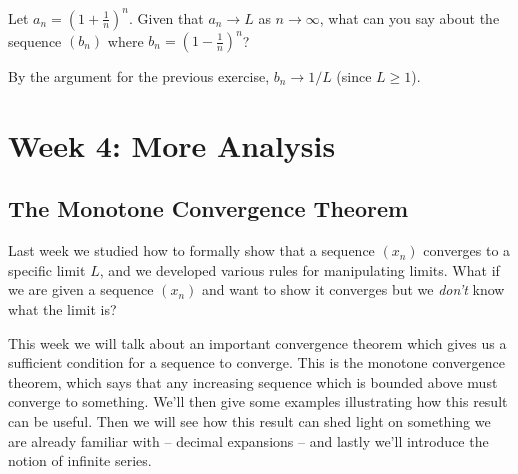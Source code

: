 \documentclass[11pt,dvipsnames]{book}
\numberwithin{figure}{section} %
\numberwithin{table}{section} %
\begin{document}
\begin{exercise}
Let $a_n = \left( 1+ \frac{1}{n}\right)^n$. Given that $a_n \to L$ as $n \to \infty$, what can you say about
the sequence $(b_n)$ where
$b_n = \left( 1- \frac{1}{n}\right)^n$?
\begin{solution}
By the argument for the previous exercise, $b_n \to 1/L$ (since $L \geq 1$).
\end{solution}
\end{exercise}

%
%


\part{Week 4: More Analysis}


\chapter{The Monotone Convergence Theorem}%
\label{monotoneconvergence}

Last week we studied how to formally show that a sequence $(x_{n})$ converges to a specific limit $L$, and we developed various rules for manipulating limits. What if we are given a sequence $(x_{n})$ and want to show it converges but we {\it don't} know what the limit is?

This week we will talk about an important convergence theorem which gives us a sufficient condition for a sequence to  converge. This is the monotone convergence theorem, which says that any increasing sequence which is bounded above must converge to something. %
We'll then give some examples illustrating how this result can be useful. Then we will see how this result can shed light on something we are already familiar with -- decimal expansions -- and lastly we'll introduce the notion of infinite series.
\end{document}
